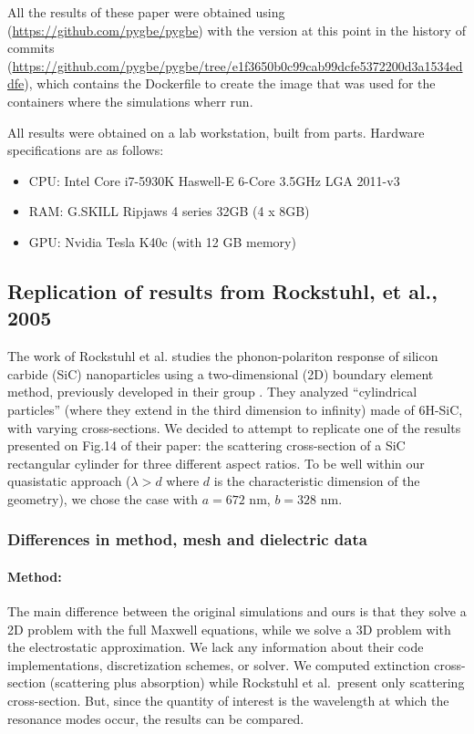 All the results of these paper were obtained using \pygbe (\url{https://github.com/pygbe/pygbe})
with the version at this point in the history of commits (\url{https://github.com/pygbe/pygbe/tree/e1f3650b0c99cab99dcfe5372200d3a1534eddfe}), which contains 
the Dockerfile to create the image that was used for the containers where the simulations wherr run. 

All results were obtained on a lab workstation, built from parts.
Hardware specifications are as follows: 
\begin{itemize}
  \item CPU: Intel Core i7-5930K Haswell-E 6-Core 3.5GHz LGA 2011-v3
  \item RAM: G.SKILL Ripjaws 4 series 32GB (4 x 8GB)
  \item GPU: Nvidia Tesla K40c (with 12 GB memory)
\end{itemize}






\subsection{Replication of results from Rockstuhl, et al., 2005}

The work of Rockstuhl et al.\cite{rockstuhl2005} studies the phonon-polariton response of silicon carbide (SiC)
nanoparticles using a two-dimensional (2D) boundary element method, 
previously developed in their group \cite{rockstuhl2003}. 
They analyzed ``cylindrical particles'' (where they extend in the third dimension to infinity) made of 6H-SiC, with varying cross-sections.
We decided to attempt to replicate one of the results presented on Fig.14 of their paper:
the scattering cross-section of a SiC rectangular cylinder for three different aspect ratios. 
To be well within our quasistatic approach ($\lambda > d$ where $d$ is the characteristic
dimension of the geometry), we chose the case with $a=672$ nm, $b=328$ nm.

\subsubsection{Differences in method, mesh and dielectric data}

\paragraph{Method:} The main difference between the original simulations and ours is that they solve a 2D problem with the 
full Maxwell equations, while we solve a 3D problem with the electrostatic approximation. 
We lack any information about their code implementations, discretization schemes, or solver.  
We computed extinction cross-section (scattering plus absorption) while Rockstuhl et al.\ present only scattering cross-section. 
But, since the quantity of interest is the wavelength at which the resonance modes occur, the results can be compared.

